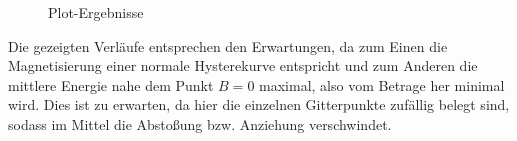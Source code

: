 \begin{figure}
  \caption{Plot-Ergebnisse}
  \label{fig:plots}
\end{figure}


Die gezeigten Verläufe entsprechen den Erwartungen, da zum Einen die Magnetisierung
einer normale Hysterekurve entspricht und zum Anderen die mittlere Energie nahe
dem Punkt $B=0$ maximal, also vom Betrage her minimal wird. Dies ist zu erwarten,
da hier die einzelnen Gitterpunkte zufällig belegt sind, sodass im Mittel die
Abstoßung bzw. Anziehung verschwindet.